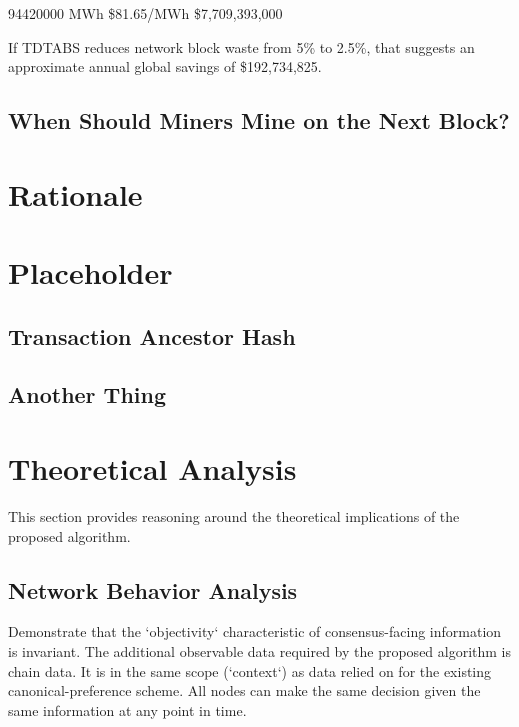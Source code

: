 \documentclass[11pt]{article}
\theoremstyle{plain}
\begin{document}
{94420000 MWh \times \$81.65/MWh \equiv \$7,709,393,000

If TDTABS reduces network block waste from 5\% to 2.5\%, that suggests an
approximate annual global savings of \$192,734,825.




\subsection{\normalsize{When Should Miners Mine on the Next Block?}}

\pagebreak
\section{\normalsize{Rationale}}

\pagebreak
\section{Placeholder}
\subsection{\normalsize{Transaction Ancestor Hash}}


\subsection{\normalsize{Another Thing}}

\pagebreak
\section{\normalsize{Theoretical Analysis}}

This section provides reasoning around the theoretical implications of the
proposed algorithm.




\subsection{\normalsize{Network Behavior Analysis}}

Demonstrate that the `objectivity` characteristic of consensus-facing
information is invariant.
The additional observable data required by the proposed algorithm is chain
data. It is in the same scope (`context`) as data relied on for the existing
canonical-preference scheme.
All nodes can make the same decision given the same information at any point in
time.

}
\end{document}
